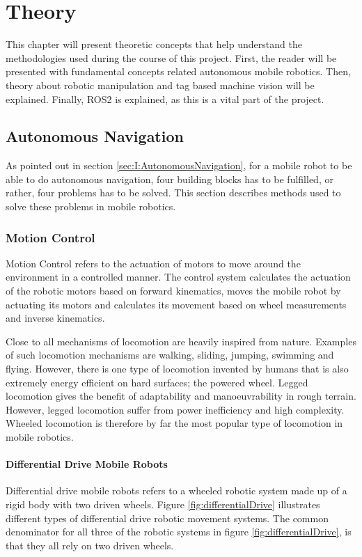 \chapter{Theory}
This chapter will present theoretic concepts that help understand the methodologies used during the course of this project. First, the reader will be presented with fundamental concepts related autonomous mobile robotics. Then, theory about robotic manipulation and tag based machine vision will be explained. Finally, ROS2 is explained, as this is a vital part of the project.

\section{Autonomous Navigation}
As pointed out in section \ref{sec:I:AutonomousNavigation}, for a mobile robot to be able to do autonomous navigation, four building blocks has to be fulfilled, or rather, four problems has to be solved. This section describes methods used to solve these problems in mobile robotics.

\subsection{Motion Control}
Motion Control refers to the actuation of motors to move around the environment in a controlled manner. The control system calculates the actuation of the robotic motors based on forward kinematics, moves the mobile robot by actuating its motors and calculates its movement based on wheel measurements and inverse kinematics.

Close to all mechanisms of locomotion are heavily inspired from nature. Examples of such locomotion mechanisms are walking, sliding, jumping, swimming and flying. However, there is one type of locomotion invented by humans that is also extremely energy efficient on hard surfaces; the powered wheel. Legged locomotion gives the benefit of adaptability and manoeuvrability in rough terrain. However, legged locomotion suffer from power inefficiency and high complexity. Wheeled locomotion is therefore by far the most popular type of locomotion in mobile robotics\cite{SiegwartRoland2011Itam}.

\subsubsection{Differential Drive Mobile Robots}
Differential drive mobile robots refers to a wheeled robotic system made up of a rigid body with two driven wheels. Figure \ref{fig:differentialDrive} illustrates different types of differential drive robotic movement systems. The common denominator for all three of the robotic systems in figure \ref{fig:differentialDrive}, is that they all rely on two driven wheels.

